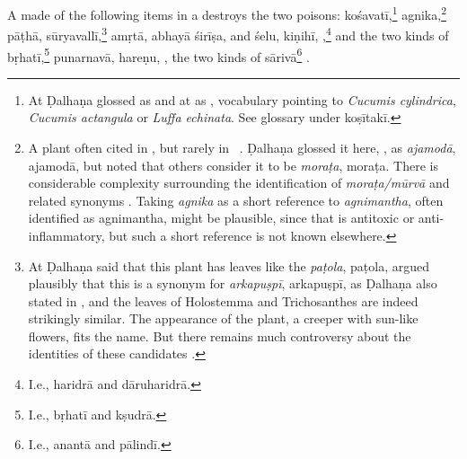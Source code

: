 \begin{translation}
    \item[45--46]
    
A  made of the following items in a
 destroys the two poisons:
\gls{kośavatī},\footnote{At  Ḍalhaṇa glossed
     as  and at  as
    , vocabulary pointing to \emph{Cucumis cylindrica},
    \emph{Cucumis actangula} or \emph{Luffa echinata}. See glossary under
    \gls{koṣītakī}.} \gls{agnika},\footnote{A plant often cited in \SS,
        but rarely in \CS\ \citep[4]{gvdb}.  Ḍalhaṇa glossed it here,
        , as \emph{ajamodā}, \gls{ajamodā},  but noted that
        others consider it to be \emph{moraṭa}, \gls{moraṭa}. There is
        considerable complexity surrounding the identification of
        \emph{moraṭa/mūrvā} and related synonyms \citep[314-316]{gvdb}.
        Taking \emph{agnika} as a short reference to \emph{agnimantha}, often
        identified  as \gls{agnimantha}, might be plausible, since that is
        antitoxic or anti-inflammatory, but such a short reference is not
        known elsewhere.} \gls{pāṭhā}, \gls{sūryavallī},\footnote{At
             Ḍalhaṇa said that this plant has leaves like the
            \emph{paṭola}, \gls{paṭola}, \citet[280, 443]{gvdb} argued plausibly
            that this is a synonym for \emph{arkapuṣpī}, \gls{arkapuṣpī}, as
            Ḍalhaṇa also stated in , and the leaves of
            Holostemma and Trichosanthes are indeed strikingly similar.  The
            appearance of the plant, a creeper with sun-like flowers, fits the
            name.  But there remains much controversy about the identities of
            these candidates \citep[e.g.,][195--198]{adps}.} %
            \gls{amṛtā}, \gls{abhayā} \gls{śirīṣa}, and \gls{śelu},
            \gls{kiṇihī}, ,\footnote{I.e., \gls{haridrā} and
                \gls{dāruharidrā}.} and the two kinds of
                \gls{bṛhatī},\footnote{I.e., \gls{bṛhatī} and
                    \gls{kṣudrā}.} \gls{punarnavā}, \gls{hareṇu}, , %
                    the two kinds of \gls{sārivā}\footnote{I.e.,
                        \gls{anantā} and \gls{pālindī}.} %
                        .
  \end{translation}


